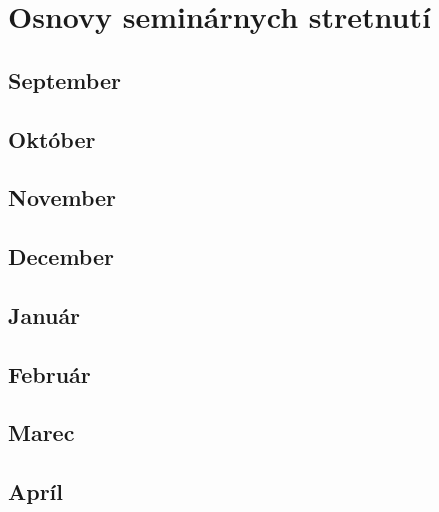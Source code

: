 \chapter{Osnovy seminárnych stretnutí}

\section{September}




\section{Október}





\section{November}





\section{December}




\section{Január}


 


\section{Február}




\section{Marec}





\section{Apríl}



 

